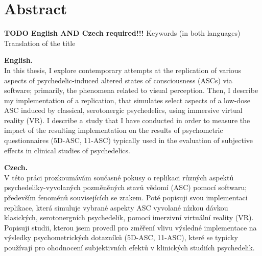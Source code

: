 \chapter*{Abstract}

\textbf{TODO English AND Czech required!!!}
Keywords (in both languages)
Translation of the title

\textbf{English.}\\
In this thesis, I explore contemporary attempts at the replication of various aspects of psychedelic-induced altered states of consciousness (ASCs) via software; primarily, the phenomena related to visual perception. Then, I describe my implementation of a replication, that simulates select aspects of a low-dose ASC induced by classical, serotonergic psychedelics, using immersive virtual reality (VR). I describe a study that I have conducted in order to measure the impact of the resulting implementation on the results of psychometric questionnaires (5D-ASC, 11-ASC) typically used in the evaluation of subjective effects in clinical studies of psychedelics.

\textbf{Czech.}\\
V této práci prozkoumávám současné pokusy o replikaci různých aspektů psychedeliky-vyvolaných pozměněných stavů vědomí (ASC) pomocí softwaru; především fenoménů souvisejících se zrakem. Poté popisuji svou implementaci replikace, která simuluje vybrané aspekty ASC vyvolané nízkou dávkou klasických, serotonergních psychedelik, pomocí imerzivní virtuální reality (VR). Popisuji studii, kterou jsem provedl pro změření vlivu výsledné implementace na výsledky psychometrických dotazníků (5D-ASC, 11-ASC), které se typicky používají pro ohodnocení subjektivních efektů v klinických studiích psychedelik.
